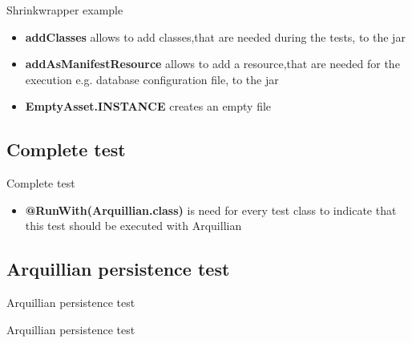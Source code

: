 \begin{frame}{Shrinkwrapper example}
  

\begin{itemize}
	\item{\textbf{addClasses} allows to add classes,that are needed during the tests, to the jar}
	\item{\textbf{addAsManifestResource} allows to add a resource,that are needed for the execution e.g. database configuration file, to the jar}
	\item{\textbf{EmptyAsset.INSTANCE} creates an empty file}
\end{itemize}

\end{frame}

\subsection[Complete test]{Complete test}
\begin{frame}{Complete test}
  
\begin{itemize}
	\item{\textbf{@RunWith(Arquillian.class)} is need for every test class to indicate that this test should be executed with Arquillian}
	
\end{itemize}
\end{frame}
\subsection[Persistence test]{Arquillian persistence test}
\begin{frame}{Arquillian persistence test}
  

\end{frame}

\begin{frame}{Arquillian persistence test}
  

\end{frame}

